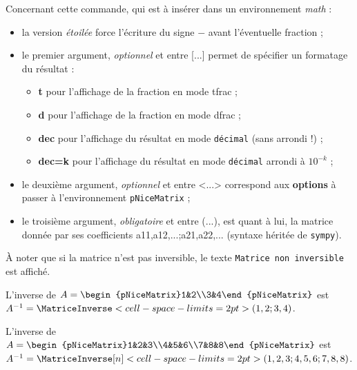 \documentclass[a4paper,11pt]{article}
\newcommand\Cle[1]{{\bfseries\sffamily\textlangle #1\textrangle}}
\begin{document}
\begin{tipblock}
Concernant cette commande, qui est à insérer dans un environnement \textit{math} :

\begin{itemize}
	\item la version \textit{étoilée} force l'écriture du signe \og $-$ \fg{} avant l'éventuelle fraction ;
	\item le premier argument, \textit{optionnel} et entre \textsf{[...]} permet de spécifier un formatage du résultat :
	\begin{itemize}
		\item \Cle{t} pour l'affichage de la fraction en mode \textsf{tfrac} ;
		\item \Cle{d} pour l'affichage de la fraction en mode \textsf{dfrac} ;
		\item \Cle{dec} pour l'affichage du résultat en mode \texttt{décimal} (sans arrondi !) ;
		\item \Cle{dec=k} pour l'affichage du résultat en mode \texttt{décimal} arrondi à $10^{-k}$ ;
	\end{itemize}
	\item le deuxième argument, \textit{optionnel} et entre \textsf{<...>} correspond aux \Cle{options} à passer à l'environnement \texttt{pNiceMatrix} ;
	\item le troisième argument, \textit{obligatoire} et entre \textsf{(...)}, est quant à lui, la matrice donnée par ses coefficients \textsf{a11,a12,...;a21,a22,...} (syntaxe héritée de \texttt{sympy}).
\end{itemize}
À noter que si la matrice n'est pas inversible, le texte \texttt{Matrice non inversible} est affiché.
\end{tipblock}

\begin{PresentationCode}{}
L'inverse de $A=\begin{pNiceMatrix}1&2\\3&4\end{pNiceMatrix}$ est
$A^{-1}=\MatriceInverse<cell-space-limits=2pt>(1,2;3,4)$.
\end{PresentationCode}

\begin{PresentationCode}{}
L'inverse de $A=\begin{pNiceMatrix}1&2&3\\4&5&6\\7&8&8\end{pNiceMatrix}$ est
$A^{-1}=\MatriceInverse[n]<cell-space-limits=2pt>(1,2,3;4,5,6;7,8,8)$.
\end{PresentationCode}
\end{document}

